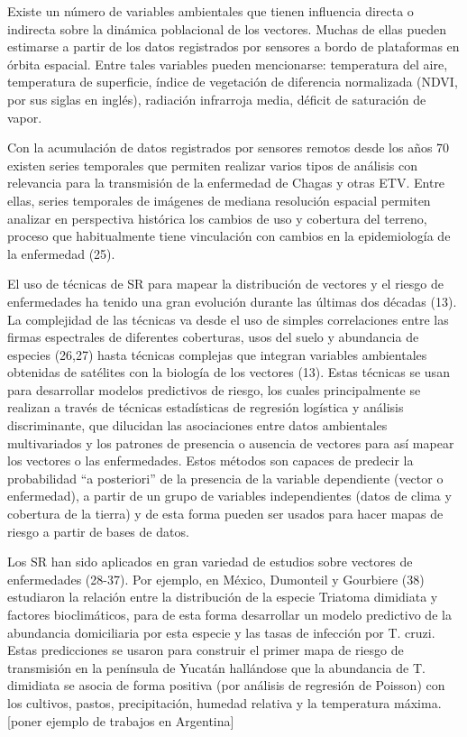 Existe un número de variables ambientales que tienen influencia directa o
indirecta sobre la dinámica poblacional de los vectores. Muchas de ellas
pueden estimarse a partir de los datos registrados por sensores a bordo de plataformas
en órbita espacial. Entre tales variables pueden mencionarse: temperatura del
aire, temperatura de superficie, índice de vegetación de diferencia normalizada
(NDVI, por sus siglas en inglés), radiación infrarroja media, déficit de saturación
de vapor.



Con la acumulación de datos registrados por sensores remotos desde los años
70 existen series temporales que permiten realizar varios tipos de análisis con
relevancia para la transmisión de la enfermedad de Chagas y otras ETV.
Entre ellas, series temporales de imágenes de mediana resolución espacial
permiten analizar en perspectiva histórica los cambios de uso y cobertura del
terreno, proceso que habitualmente tiene vinculación con cambios en la
epidemiología de la enfermedad (25).

El uso de técnicas de SR para mapear la distribución de vectores y el riesgo
de enfermedades ha tenido una gran evolución durante las últimas dos
décadas (13). La complejidad de las técnicas va desde el uso de simples
correlaciones entre las firmas espectrales de diferentes coberturas, usos del
suelo y abundancia de especies (26,27) hasta técnicas complejas que integran variables
ambientales obtenidas de satélites con la biología de los vectores (13).
Estas técnicas se usan para desarrollar modelos predictivos de riesgo,
los cuales principalmente se realizan a través de técnicas estadísticas de
regresión logística y análisis discriminante, que dilucidan las asociaciones
entre datos ambientales multivariados y los patrones de presencia o ausencia de
vectores para así mapear los vectores o las enfermedades.
Estos métodos son capaces de predecir la probabilidad “a posteriori” de la
presencia de la variable dependiente (vector o enfermedad), a partir de un
grupo de variables independientes (datos de clima y cobertura de la tierra) y de esta
forma pueden ser usados para hacer mapas de riesgo a partir de bases de datos.

Los SR han sido aplicados en gran variedad de estudios sobre vectores de
enfermedades (28-37). Por ejemplo, en México, Dumonteil y Gourbiere (38)
estudiaron la relación entre la distribución de la especie Triatoma dimidiata
y factores bioclimáticos, para de esta forma desarrollar un modelo predictivo de
la abundancia domiciliaria por esta especie y las tasas de infección
por T. cruzi. Estas predicciones se usaron para construir el primer mapa de
riesgo de transmisión en la península de Yucatán hallándose que la abundancia de T.
dimidiata se asocia de forma positiva (por análisis de regresión de Poisson)
con los cultivos, pastos, precipitación, humedad relativa y la temperatura
máxima. [poner ejemplo de trabajos en Argentina]

